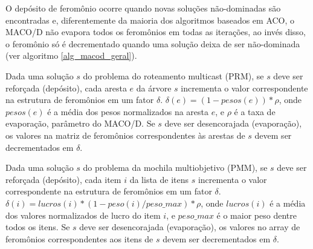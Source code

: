 O depósito de feromônio ocorre quando novas soluções não-dominadas são encontradas e, diferentemente da maioria dos algoritmos baseados em ACO, o MACO/D não evapora todos os feromônios em todas as iterações, ao invés disso, o feromônio só é decrementado quando uma solução deixa de ser não-dominada (ver algoritmo \ref{alg_macod_geral}).

Dada uma solução $s$ do problema do roteamento multicast (PRM), se $s$ deve ser reforçada (depósito), cada aresta $e$ da árvore $s$ incrementa o valor correspondente na estrutura de feromônios em um fator $\delta$. $\delta(e) = (1 - pesos(e)) * \rho$, onde $pesos(e)$ é a média dos pesos normalizados na aresta $e$, e $\rho$ é a taxa de evaporação, parâmetro do MACO/D. Se $s$ deve ser desencorajada (evaporação), os valores na matriz de feromônios correspondentes às arestas de $s$ devem ser decrementados em $\delta$.

Dada uma solução $s$ do problema da mochila multiobjetivo (PMM), se $s$ deve ser reforçada (depósito), cada item $i$ da lista de itens $s$ incrementa o valor correspondente na estrutura de feromônios em um fator $\delta$. $\delta(i) = lucros(i) * (1 - peso(i) / peso\_{max}) * \rho$, onde $lucros(i)$ é a média dos valores normalizados de lucro do item $i$, e $peso\_{max}$ é o maior peso dentre todos os itens. Se $s$ deve ser desencorajada (evaporação), os valores no array de feromônios correspondentes aos itens de $s$ devem ser decrementados em $\delta$.